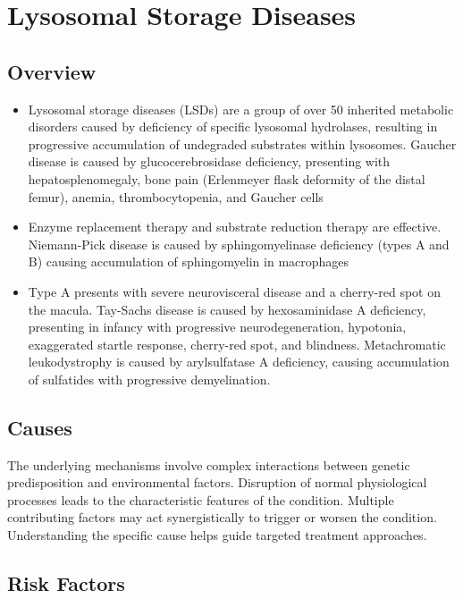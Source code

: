 \chapter{Lysosomal Storage Diseases}
\label{sec:Lysosomal Storage Diseases}

\section{Overview}


\begin{itemize}[noitemsep]
  \item Lysosomal storage diseases (LSDs) are a group of over 50 inherited metabolic disorders caused by deficiency of specific lysosomal hydrolases, resulting in progressive accumulation of undegraded substrates within lysosomes. Gaucher disease is caused by glucocerebrosidase deficiency, presenting with hepatosplenomegaly, bone pain (Erlenmeyer flask deformity of the distal femur), anemia, thrombocytopenia, and Gaucher cells
  \item Enzyme replacement therapy and substrate reduction therapy are effective. Niemann-Pick disease is caused by sphingomyelinase deficiency (types A and B) causing accumulation of sphingomyelin in macrophages
  \item Type A presents with severe neurovisceral disease and a cherry-red spot on the macula. Tay-Sachs disease is caused by hexosaminidase A deficiency, presenting in infancy with progressive neurodegeneration, hypotonia, exaggerated startle response, cherry-red spot, and blindness. Metachromatic leukodystrophy is caused by arylsulfatase A deficiency, causing accumulation of sulfatides with progressive demyelination.
\end{itemize}
\section{Causes}
The underlying mechanisms involve complex interactions between genetic predisposition and environmental factors. Disruption of normal physiological processes leads to the characteristic features of the condition. Multiple contributing factors may act synergistically to trigger or worsen the condition. Understanding the specific cause helps guide targeted treatment approaches.
\section{Risk Factors}


